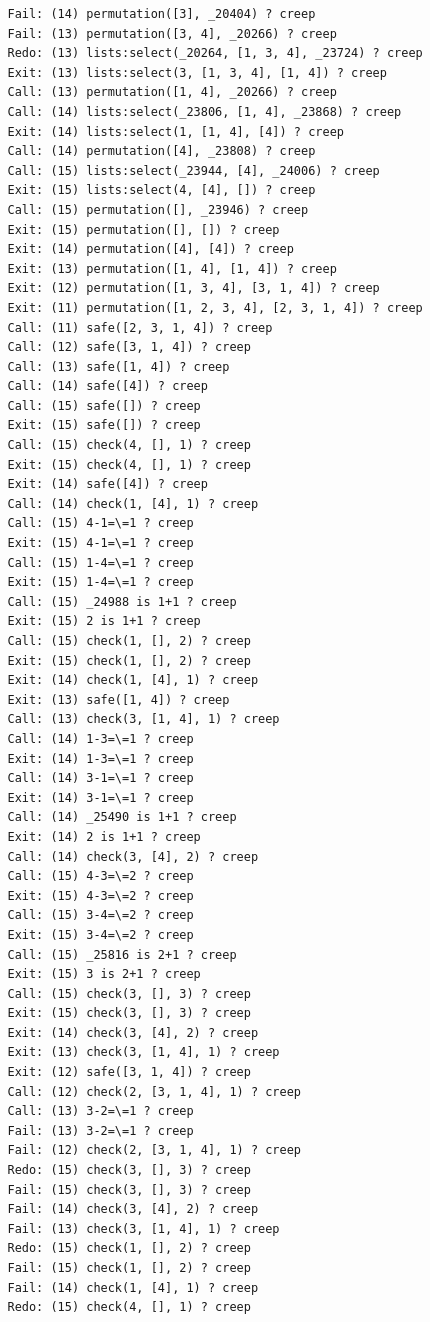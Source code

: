 \documentclass{article}
\begin{document}
\begin{verbatim}
   Fail: (14) permutation([3], _20404) ? creep
   Fail: (13) permutation([3, 4], _20266) ? creep
   Redo: (13) lists:select(_20264, [1, 3, 4], _23724) ? creep
   Exit: (13) lists:select(3, [1, 3, 4], [1, 4]) ? creep
   Call: (13) permutation([1, 4], _20266) ? creep
   Call: (14) lists:select(_23806, [1, 4], _23868) ? creep
   Exit: (14) lists:select(1, [1, 4], [4]) ? creep
   Call: (14) permutation([4], _23808) ? creep
   Call: (15) lists:select(_23944, [4], _24006) ? creep
   Exit: (15) lists:select(4, [4], []) ? creep
   Call: (15) permutation([], _23946) ? creep
   Exit: (15) permutation([], []) ? creep
   Exit: (14) permutation([4], [4]) ? creep
   Exit: (13) permutation([1, 4], [1, 4]) ? creep
   Exit: (12) permutation([1, 3, 4], [3, 1, 4]) ? creep
   Exit: (11) permutation([1, 2, 3, 4], [2, 3, 1, 4]) ? creep
   Call: (11) safe([2, 3, 1, 4]) ? creep
   Call: (12) safe([3, 1, 4]) ? creep
   Call: (13) safe([1, 4]) ? creep
   Call: (14) safe([4]) ? creep
   Call: (15) safe([]) ? creep
   Exit: (15) safe([]) ? creep
   Call: (15) check(4, [], 1) ? creep
   Exit: (15) check(4, [], 1) ? creep
   Exit: (14) safe([4]) ? creep
   Call: (14) check(1, [4], 1) ? creep
   Call: (15) 4-1=\=1 ? creep
   Exit: (15) 4-1=\=1 ? creep
   Call: (15) 1-4=\=1 ? creep
   Exit: (15) 1-4=\=1 ? creep
   Call: (15) _24988 is 1+1 ? creep
   Exit: (15) 2 is 1+1 ? creep
   Call: (15) check(1, [], 2) ? creep
   Exit: (15) check(1, [], 2) ? creep
   Exit: (14) check(1, [4], 1) ? creep
   Exit: (13) safe([1, 4]) ? creep
   Call: (13) check(3, [1, 4], 1) ? creep
   Call: (14) 1-3=\=1 ? creep
   Exit: (14) 1-3=\=1 ? creep
   Call: (14) 3-1=\=1 ? creep
   Exit: (14) 3-1=\=1 ? creep
   Call: (14) _25490 is 1+1 ? creep
   Exit: (14) 2 is 1+1 ? creep
   Call: (14) check(3, [4], 2) ? creep
   Call: (15) 4-3=\=2 ? creep
   Exit: (15) 4-3=\=2 ? creep
   Call: (15) 3-4=\=2 ? creep
   Exit: (15) 3-4=\=2 ? creep
   Call: (15) _25816 is 2+1 ? creep
   Exit: (15) 3 is 2+1 ? creep
   Call: (15) check(3, [], 3) ? creep
   Exit: (15) check(3, [], 3) ? creep
   Exit: (14) check(3, [4], 2) ? creep
   Exit: (13) check(3, [1, 4], 1) ? creep
   Exit: (12) safe([3, 1, 4]) ? creep
   Call: (12) check(2, [3, 1, 4], 1) ? creep
   Call: (13) 3-2=\=1 ? creep
   Fail: (13) 3-2=\=1 ? creep
   Fail: (12) check(2, [3, 1, 4], 1) ? creep
   Redo: (15) check(3, [], 3) ? creep
   Fail: (15) check(3, [], 3) ? creep
   Fail: (14) check(3, [4], 2) ? creep
   Fail: (13) check(3, [1, 4], 1) ? creep
   Redo: (15) check(1, [], 2) ? creep
   Fail: (15) check(1, [], 2) ? creep
   Fail: (14) check(1, [4], 1) ? creep
   Redo: (15) check(4, [], 1) ? creep

\end{verbatim}
\end{document}
